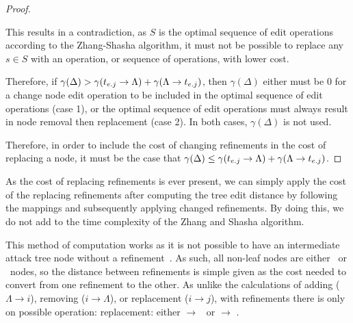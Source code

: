 \begin{lemma}
\begin{proof}
\begin{enumerate}
                  This results in a contradiction, as $S$ is the optimal sequence of edit operations according to the Zhang-Shasha algorithm, it must not be possible to replace any $s \in S$ with an operation, or sequence of operations, with lower cost.
        \end{enumerate}

        Therefore, if $\gamma(\Delta) > \gamma(t_{{e}.{j}} \rightarrow {\Lambda}) + \gamma(\Lambda \rightarrow {t_{{e}.{j}}})$, then $\gamma(\Delta)$ either must be 0 for a change node edit operation to be included in the optimal sequence of edit operations (case 1), or the optimal sequence of edit operations must always result in node removal then replacement (case 2). In both cases, $\gamma(\Delta)$ is not used.

        Therefore, in order to include the cost of changing refinements in the cost of replacing a node, it must be the case that $\gamma(\Delta) \le \gamma(t_{{e}.{j}} \rightarrow {\Lambda}) + \gamma(\Lambda \rightarrow {t_{{e}.{j}}})$.


    \end{proof}


\end{lemma}



As the cost of replacing refinements is ever present, we can simply apply the cost of the replacing refinements after computing the tree edit distance by following the mappings and subsequently applying changed refinements. By doing this, we do not add to the time complexity of the Zhang and Shasha algorithm.

This method of computation works as it is not possible to have an intermediate attack tree node without a refinement~\cite{mauw_foundations_2006}. As such, all non-leaf nodes are either \AND\ or \OR\ nodes, so the distance between refinements is simple given as the cost needed to convert from one refinement to the other. As unlike the calculations of adding ($\Lambda \rightarrow i$), removing ($i \rightarrow \Lambda$), or replacement ($i \rightarrow j$), with refinements there is only on possible operation: replacement: either \AND $\rightarrow$ \OR\ or \OR $\rightarrow$ \AND.



